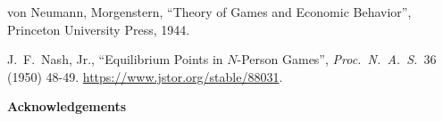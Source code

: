 \documentclass[a4paper,11pt,oneside]{article}
\begin{document}
\begin{titlepage}
    \begin{center}
        \vspace*{1cm}
 
        \LARGE
 
        \vspace{0.5cm}
        \LARGE
    	

        \vspace{1.5cm}
 
 
        \vfill
  
        \vspace{0.8cm}
 
    \end{center}
\end{titlepage}




\setcounter{page}{0}
\tableofcontents
\thispagestyle{empty}
\clearpage



\newpage
\begin{thebibliography}{9}

von Neumann, Morgenstern,
``Theory of Games and Economic Behavior'',
Princeton University Press, 1944.

J.\ F.\ Nash, Jr.,
``Equilibrium Points in $N$-Person Games'', 
\emph{Proc.\ N.\ A.\ S.}\ 36 (1950) 48-49.
\url{https://www.jstor.org/stable/88031}.

\end{thebibliography}
\vspace{2cm}
\begin{center}
    \Large\textbf{Acknowledgements}
\end{center}
\end{document}
